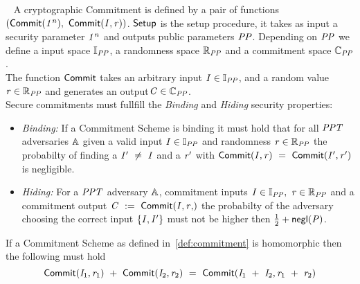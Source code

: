 \begin{definition}\label{def:commitment}~\cite{bunz2018bulletproofs}
    A cryptographic Commitment is defined by a pair of functions $(\mathsf{Commit}(\mathit{1^n}) ,~ \mathsf{Commit}(\mathit{I}, \mathit{r}))$. $\mathsf{Setup}$ is the setup procedure, it takes as input a
    security parameter $\mathit{1^n}$ and outputs public parameters $\mathit{PP}$. Depending on $\mathit{PP}$ we define a input space $\mathbb{I}_{\mathit{PP}}$,
    a randomness space $\mathbb{R}_{\mathit{PP}}$ and a commitment space $\mathbb{C}_{\mathit{PP}}$.\\
    The function $\mathsf{Commit}$ takes an arbitrary input $\mathit{I} \in \mathbb{I}_{\mathit{PP}}$, and a random value $\mathit{r} \in \mathbb{R}_{\mathit{PP}}$ and
    generates an output$\mathit{C} \in \mathbb{C}_{\mathit{PP}}$.\\
    Secure commitments must fullfill the \textit{Binding} and \textit{Hiding} security properties:
    \begin{itemize}
        \item \textit{Binding:} If a Commitment Scheme is binding it must hold that for all $\mathit{PPT}$ adversaries $\mathbb{A}$ given a valid input $\mathit{I} \in \mathbb{I}_{\mathit{PP}}$
        and randomness $\mathit{r} \in \mathbb{R}_{\mathit{PP}}$ the probabilty of finding a $\mathit{I}' ~\neq~ \mathit{I}$ and a $\mathit{r}'$ with
        $\mathsf{Commit}(\mathit{I}, \mathit{r}) ~=~ \mathsf{Commit}(\mathit{I}', \mathit{r}')$ is negligible.
        \item \textit{Hiding:} For a $\mathit{PPT}$ adversary $\mathbb{A}$, commitment inputs $\mathit{I} \in \mathbb{I}_{\mathit{PP}} ,~ \mathit{r} \in
       \mathbb{R}_{\mathit{PP}}$ and a commitment output $\varCommitment \opAssign \procCommit{\varInput, \varRand}$ the probabilty of the adversary choosing the correct input
        $\{\mathit{I}, \mathit{I}'\}$ must not be higher then $\frac{1}{2} + \mathsf{negl}(\mathit{P})$.
    \end{itemize}
\end{definition}

\begin{definition}\label{def:homomorphicCom}
    If a Commitment Scheme as defined in~\ref{def:commitment} is homomorphic then the following must hold
    \[ \mathsf{Commit}(\mathit{I}_1, \mathit{r}_1) ~+~ \mathsf{Commit}(\mathit{I}_2, \mathit{r}_2) ~=~ \mathsf{Commit}(\mathit{I}_1 ~+~ \mathit{I}_2, \mathit{r}_1 ~+~ \mathit{r}_2) \]
\end{definition}

